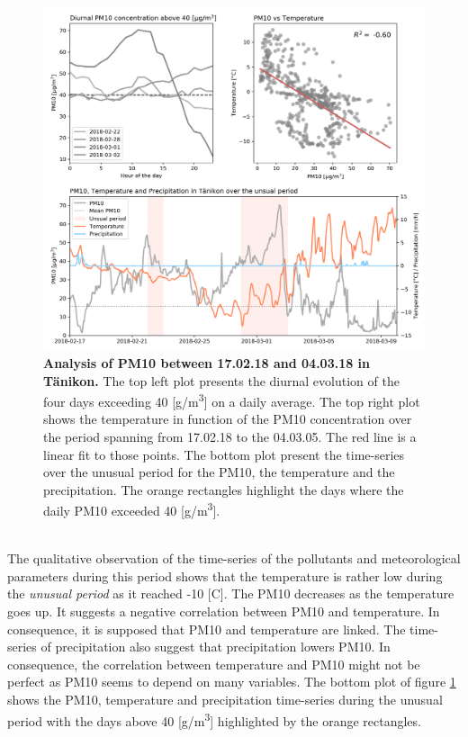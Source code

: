 \documentclass[a4paper, 12pt]{article}
\begin{document}
    \begin{figure}[t]
        \centering
        \includegraphics[width = 1 \textwidth]{Figures/UnsualPeriodPM10Tanikon.png}
        \caption{\textbf{Analysis of PM10 between 17.02.18 and 04.03.18 in Tänikon.} The top left plot presents the diurnal evolution of the four days exceeding 40 [\textmu g/m\textsuperscript{3}] on a daily average. The top right plot shows the temperature in function of the PM10 concentration over the period spanning from 17.02.18 to the 04.03.05. The red line is a linear fit to those points. The bottom plot present the time-series over the unusual period for the PM10, the temperature and the precipitation. The orange rectangles highlight the days where the daily PM10 exceeded 40 [\textmu g/m\textsuperscript{3}].}
        \label{fig:unusual-summary-plots}
    \end{figure}
    \\
    The qualitative observation of the time-series of the pollutants and meteorological parameters during this period shows that the temperature is rather low during the \textit{unusual period} as it reached -10 [\degree C]. The PM10 decreases as the temperature goes up. It suggests a negative correlation between PM10 and temperature. In consequence, it is supposed that PM10 and temperature are linked. The time-series of precipitation also suggest that precipitation lowers PM10. In consequence, the correlation between temperature and PM10 might not be perfect as PM10 seems to depend on many variables. The bottom plot of figure \ref{fig:unusual-summary-plots} shows the PM10, temperature and precipitation time-series during the unusual period with the days above 40 [\textmu g/m\textsuperscript{3}] highlighted by the orange rectangles. 
\end{document}
